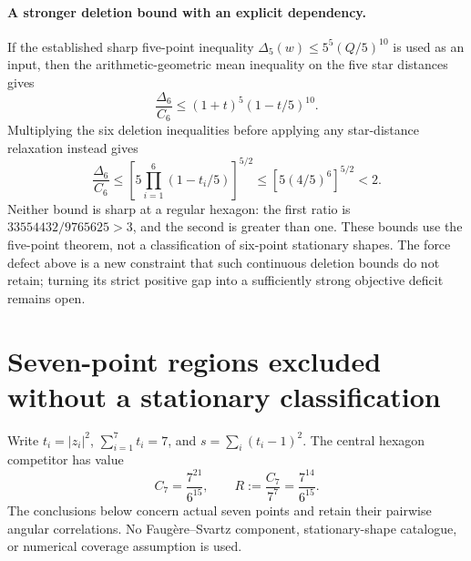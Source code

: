 \documentclass[11pt]{article}
\theoremstyle{remark}
\numberwithin{equation}{section}
\begin{document}
\paragraph{A stronger deletion bound with an explicit dependency.}
If the established sharp five-point inequality
$\Delta_5(w)\le5^5(Q/5)^{10}$ is used as an input, then
the arithmetic-geometric mean inequality on the five star distances
gives
\[
 \frac{\Delta_6}{C_6}
             \le(1+t)^5(1-t/5)^{10}.
\]
Multiplying the six deletion inequalities before applying any
star-distance relaxation instead gives
\[
 \frac{\Delta_6}{C_6}
       \le\left[5\prod_{i=1}^6(1-t_i/5)\right]^{5/2}
       \le\left[5(4/5)^6\right]^{5/2}<2.
\]
Neither bound is sharp at a regular hexagon: the first ratio is
$33554432/9765625>3$, and the second is greater than one.
These bounds use the five-point theorem, not a classification of
six-point stationary shapes. The force defect above is a new
constraint that such continuous deletion bounds do not retain;
turning its strict positive gap into a sufficiently strong
objective deficit remains open.

\section{Seven-point regions excluded without a stationary classification}
\label{sec:noorigin-oct7-seven}

Write $t_i=|z_i|^2$, $\sum_{i=1}^7t_i=7$, and
$s=\sum_i(t_i-1)^2$. The central hexagon competitor has value
\[
 C_7=\frac{7^{21}}{6^{15}},\qquad
 R:=\frac{C_7}{7^7}=\frac{7^{14}}{6^{15}}.
\]
The conclusions below concern actual seven points and retain their
pairwise angular correlations. No Faug\`ere--Svartz component,
stationary-shape catalogue, or numerical coverage assumption is used.
\end{document}
